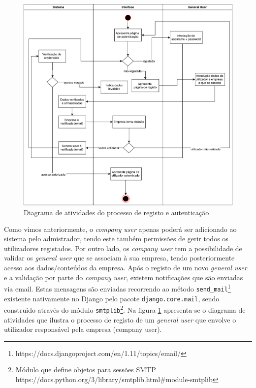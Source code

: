 \begin{figure}[!htb]
	\centering
	\includegraphics[width=\linewidth]{esquemas/activitydiagram-autenticacao.pdf}
	\caption{Diagrama de atividades do processo de registo e autenticação}
	\label{activt-autent}
\end{figure}


Como vimos anteriormente, o \textit{company user} apenas poderá ser adicionado ao sistema pelo admistrador, tendo este também permissões de gerir todos os utilizadores registados. Por outro lado, os \textit{company user} tem a possibilidade de validar os \textit{general user} que se associam à sua empresa, tendo posteriormente acesso aos dados/conteúdos da empresa. Após o registo de um novo \textit{general user} e a validação por parte do \textit{company user}, existem notificações que são enviadas via email. Estas mensagens são enviadas recorrendo ao método \texttt{send\_mail}\footnote{https://docs.djangoproject.com/en/1.11/topics/email/} existente nativamente no Django pelo pacote \texttt{django.core.mail}, sendo construido através do módulo \texttt{smtplib}\footnote{Módulo que define objetos para sessões \ac{SMTP} https://docs.python.org/3/library/smtplib.html\#module-smtplib}. Na figura \ref{activt-autent} apresenta-se o diagrama de atividades que ilustra o processo de registo de um \textit{general user} que envolve o utilizador responsável pela empresa (company user). 








